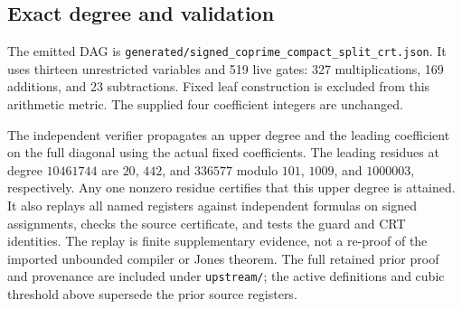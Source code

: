\subsection{Exact degree and validation}
The emitted DAG is \texttt{generated/signed\_coprime\_compact\_split\_crt.json}. It uses thirteen unrestricted variables and 519 live gates: 327 multiplications, 169 additions, and 23 subtractions. Fixed leaf construction is excluded from this arithmetic metric. The supplied four coefficient integers are unchanged.

The independent verifier propagates an upper degree and the leading coefficient on the full diagonal using the actual fixed coefficients. The leading residues at degree $10461744$ are $20$, $442$, and $336577$ modulo $101$, $1009$, and $1000003$, respectively. Any one nonzero residue certifies that this upper degree is attained. It also replays all named registers against independent formulas on signed assignments, checks the source certificate, and tests the guard and CRT identities. The replay is finite supplementary evidence, not a re-proof of the imported unbounded compiler or Jones theorem. The full retained prior proof and provenance are included under \texttt{upstream/}; the active definitions and cubic threshold above supersede the prior source registers.

